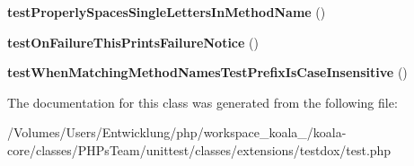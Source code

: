 \begin{DoxyCompactItemize}
\item 
\hypertarget{class_test_of_test_dox_reporter_a51991a0e06cb163623b3fc04a8786e8f}{
{\bfseries testProperlySpacesSingleLettersInMethodName} ()}
\label{class_test_of_test_dox_reporter_a51991a0e06cb163623b3fc04a8786e8f}

\item 
\hypertarget{class_test_of_test_dox_reporter_afd424115206c41828f366992cfe8689c}{
{\bfseries testOnFailureThisPrintsFailureNotice} ()}
\label{class_test_of_test_dox_reporter_afd424115206c41828f366992cfe8689c}

\item 
\hypertarget{class_test_of_test_dox_reporter_ae8d01c023f278444eea9cbe1dae90bf0}{
{\bfseries testWhenMatchingMethodNamesTestPrefixIsCaseInsensitive} ()}
\label{class_test_of_test_dox_reporter_ae8d01c023f278444eea9cbe1dae90bf0}

\end{DoxyCompactItemize}


The documentation for this class was generated from the following file:\begin{DoxyCompactItemize}
\item 
/Volumes/Users/Entwicklung/php/workspace\_\-koala\_/koala-\/core/classes/PHPsTeam/unittest/classes/extensions/testdox/test.php\end{DoxyCompactItemize}
